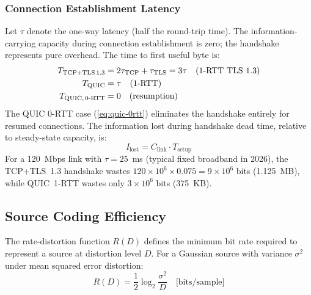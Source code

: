 \subsubsection{Connection Establishment Latency}

Let $\tau$ denote the one-way latency (half the round-trip time). The
information-carrying capacity during connection establishment is zero;
the handshake represents pure overhead. The time to first useful byte
is:
\begin{align}
  T_{\text{TCP+TLS\,1.3}} &= 2\tau_{\text{TCP}} + \tau_{\text{TLS}}
    = 3\tau \quad \text{(1-RTT TLS~1.3)} \label{eq:tcp-setup} \\
  T_{\text{QUIC}} &= \tau \quad \text{(1-RTT)}
    \label{eq:quic-setup} \\
  T_{\text{QUIC,\,0-RTT}} &= 0 \quad \text{(resumption)}
    \label{eq:quic-0rtt}
\end{align}
The QUIC 0-RTT case (\ref{eq:quic-0rtt}) eliminates the handshake
entirely for resumed connections. The information lost during
handshake dead time, relative to steady-state capacity, is:
\begin{equation}
  I_{\text{lost}} = C_{\text{link}} \cdot T_{\text{setup}}
  \label{eq:ilost}
\end{equation}
For a 120~Mbps link with $\tau = 25$~ms (typical fixed broadband in
2026), the TCP+TLS~1.3 handshake wastes $120 \times 10^6 \times 0.075
= 9 \times 10^6$ bits (1.125~MB), while QUIC~1-RTT wastes only
$3 \times 10^6$ bits (375~KB).

\subsection{Source Coding Efficiency}

The rate-distortion function $R(D)$ defines the minimum bit rate
required to represent a source at distortion level $D$. For a
Gaussian source with variance $\sigma^2$ under mean squared error
distortion:
\begin{equation}
  R(D) = \frac{1}{2} \log_2 \frac{\sigma^2}{D}
    \quad \text{[bits/sample]}
  \label{eq:rate-distortion}
\end{equation}


